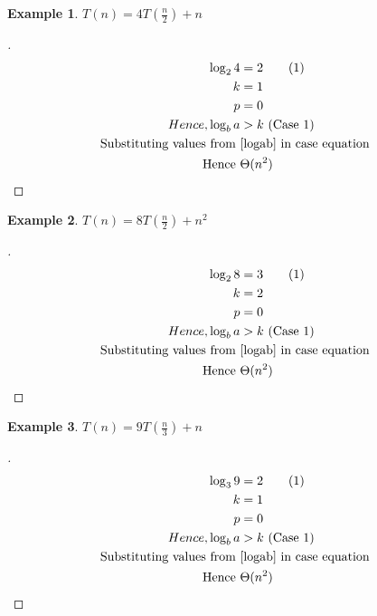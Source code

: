 \documentclass[]{article}
\theoremstyle{plain}
\theoremstyle{definition}
\newtheorem{lem}{Example}[thm]
\begin{document}
\begin{lem}
    $T(n) = 4T(\frac{n}{2}) + n$
    \begin{proof}[]
        \begin{align*}
            \log_2{4} &= 2 \tag{1} \label{logab}\\
            k &= 1\\
            p &= 0\\
            Hence, 
            \log_b{a} &> k \text{ (Case 1)}\\
            \text{Substituting values from }  &\text{{\ref{logab}} in case equation}\\
            \text{Hence } &\Theta(n^2)
        \end{align*}
    \end{proof}
\end{lem}

\begin{lem}
    $T(n) = 8T(\frac{n}{2}) + n^2$
    \begin{proof}[]
        \begin{align*}
            \log_2{8} &= 3 \tag{1} \label{logab}\\
            k &= 2\\
            p &= 0\\
            Hence, 
            \log_b{a} &> k \text{ (Case 1)}\\
            \text{Substituting values from }  &\text{{\ref{logab}} in case equation}\\
            \text{Hence } &\Theta(n^2)
        \end{align*}
    \end{proof}
\end{lem}

\begin{lem}
    $T(n) = 9T(\frac{n}{3}) + n$
    \begin{proof}[]
        \begin{align*}
            \log_3{9} &= 2 \tag{1} \label{logab}\\
            k &= 1\\
            p &= 0\\
            Hence, 
            \log_b{a} &> k \text{ (Case 1)}\\
            \text{Substituting values from }  &\text{{\ref{logab}} in case equation}\\
            \text{Hence } &\Theta(n^2)
        \end{align*}
    \end{proof}
\end{lem}
\end{document}
